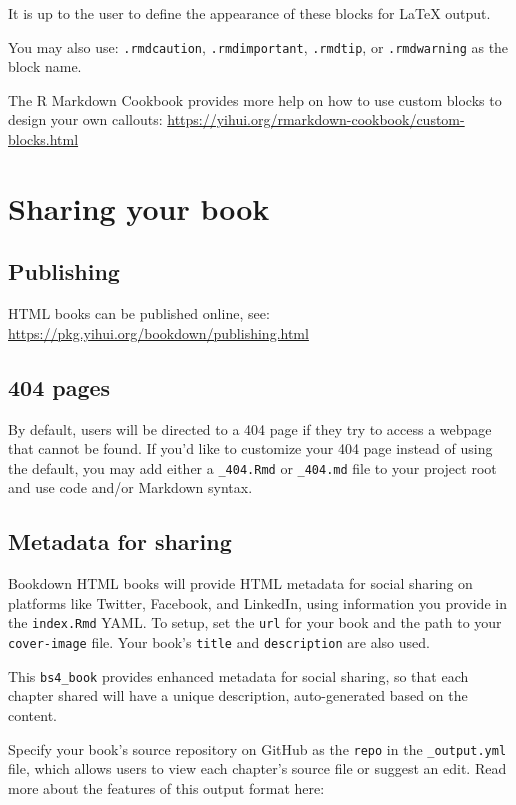 \documentclass[
]{book}
\theoremstyle{definition}
\theoremstyle{definition}
\theoremstyle{definition}
\theoremstyle{definition}
\theoremstyle{remark}
\begin{document}
It is up to the user to define the appearance of these blocks for LaTeX output.

You may also use: \texttt{.rmdcaution}, \texttt{.rmdimportant}, \texttt{.rmdtip}, or \texttt{.rmdwarning} as the block name.

The R Markdown Cookbook provides more help on how to use custom blocks to design your own callouts: \url{https://yihui.org/rmarkdown-cookbook/custom-blocks.html}

\chapter{Sharing your book}\label{sharing-your-book}

\section{Publishing}\label{publishing}

HTML books can be published online, see: \url{https://pkg.yihui.org/bookdown/publishing.html}

\section{404 pages}\label{pages}

By default, users will be directed to a 404 page if they try to access a webpage that cannot be found. If you'd like to customize your 404 page instead of using the default, you may add either a \texttt{\_404.Rmd} or \texttt{\_404.md} file to your project root and use code and/or Markdown syntax.

\section{Metadata for sharing}\label{metadata-for-sharing}

Bookdown HTML books will provide HTML metadata for social sharing on platforms like Twitter, Facebook, and LinkedIn, using information you provide in the \texttt{index.Rmd} YAML. To setup, set the \texttt{url} for your book and the path to your \texttt{cover-image} file. Your book's \texttt{title} and \texttt{description} are also used.

This \texttt{bs4\_book} provides enhanced metadata for social sharing, so that each chapter shared will have a unique description, auto-generated based on the content.

Specify your book's source repository on GitHub as the \texttt{repo} in the \texttt{\_output.yml} file, which allows users to view each chapter's source file or suggest an edit. Read more about the features of this output format here:
\end{document}
